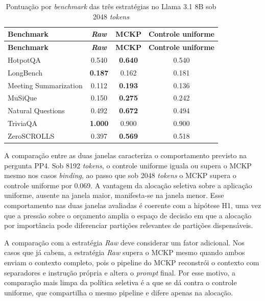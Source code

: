 {
\footnotesize
\setlength{\tabcolsep}{6pt}
\begin{longtable}{lccc}
\caption{Pontuação por \textit{benchmark} das três estratégias no Llama 3.1 8B sob 2048 \textit{tokens}}
\label{tab:mckp-solver-tarefas} \\
\toprule
\textbf{Benchmark} & \textbf{\textit{Raw}} & \textbf{MCKP} & \textbf{Controle uniforme} \\
\midrule
\endfirsthead
\toprule
\textbf{Benchmark} & \textbf{\textit{Raw}} & \textbf{MCKP} & \textbf{Controle uniforme} \\
\midrule
\endhead
\bottomrule
\endfoot
\bottomrule
\endlastfoot
HotpotQA               & 0.540          & \textbf{0.640} & 0.540 \\
LongBench              & \textbf{0.187} & 0.162          & 0.181 \\
Meeting Summarization  & 0.112          & \textbf{0.193} & 0.136 \\
MuSiQue                & 0.150          & \textbf{0.275} & 0.242 \\
Natural Questions      & 0.492          & \textbf{0.672} & 0.494 \\
TriviaQA               & \textbf{1.000} & 0.900          & 0.900 \\
ZeroSCROLLS            & 0.397          & \textbf{0.569} & 0.518 \\
\end{longtable}
}

A comparação entre as duas janelas caracteriza o comportamento previsto na pergunta PP4. Sob 8192 \textit{tokens}, o controle uniforme iguala ou supera o MCKP mesmo nos casos \textit{binding}, ao passo que sob 2048 \textit{tokens} o MCKP supera o controle uniforme por 0.069. A vantagem da alocação seletiva sobre a aplicação uniforme, ausente na janela maior, manifesta-se na janela menor. Esse comportamento nas duas janelas avaliadas é coerente com a hipótese H1, uma vez que a pressão sobre o orçamento amplia o espaço de decisão em que a alocação por importância pode diferenciar partições relevantes de partições dispensáveis.

A comparação com a estratégia \textit{Raw} deve considerar um fator adicional. Nos casos que já cabem, a estratégia \textit{Raw} supera o MCKP mesmo quando ambos enviam o contexto completo, pois o pipeline do MCKP reconstrói o contexto com separadores e instrução própria e altera o \textit{prompt} final. Por esse motivo, a comparação mais limpa da política seletiva é a que se dá contra o controle uniforme, que compartilha o mesmo pipeline e difere apenas na alocação.

